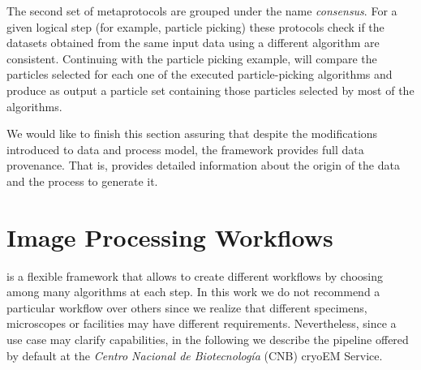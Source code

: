 The second set of metaprotocols are grouped under the name \emph{consensus}. For a given logical step (for example, particle picking) these protocols check if the datasets obtained from the same input data using a different algorithm are consistent. Continuing with the particle picking example,  will compare the particles selected for each one of the executed particle-picking algorithms and produce as output a particle set containing those particles selected by most of the algorithms.

We would like to finish this section assuring that despite the modifications introduced to \scipion data and process model, the framework provides full data provenance. That is, \scipion provides detailed information about the origin of the data  and the process to generate it.





\section{Image Processing Workflows}

\scipion is a flexible framework that allows to create different workflows by choosing among many algorithms at each step. In this work we do not recommend a particular workflow  over others since we realize that different specimens, microscopes or facilities may have different requirements. Nevertheless, since a use case may clarify \scipion capabilities, in the following we describe the pipeline offered by default at the \emph{Centro Nacional de Biotecnología} (CNB) cryoEM Service.

